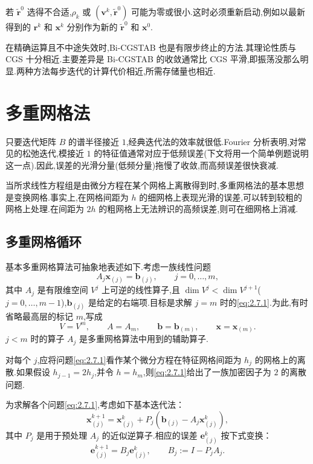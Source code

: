 若 \(\widetilde{\boldsymbol{r}}^0\) 选得不合适,\(\rho_k\) 或 \((\boldsymbol{v}^k,\widetilde{\boldsymbol{r}}^0)\) 可能为零或很小.这时必须重新启动,例如以最新得到的 \(\boldsymbol{r}^k\) 和 \(\boldsymbol{x}^k\) 分别作为新的 \(\widetilde{\boldsymbol{r}}^0\) 和 \(\boldsymbol{x}^0\).

在精确运算且不中途失效时,Bi-CGSTAB 也是有限步终止的方法.其理论性质与 CGS 十分相近.主要差异是 Bi-CGSTAB 的收敛通常比 CGS 平滑,即振荡没那么明显.两种方法每步迭代的计算代价相近,所需存储量也相近.

\section{多重网格法}\label{sec:2.7}

只要迭代矩阵 \(B\) 的谱半径接近 \(1\),经典迭代法的效率就很低.Fourier 分析表明,对常见的松弛迭代,模接近 \(1\) 的特征值通常对应于低频误差(下文将用一个简单例题说明这一点).因此,误差的光滑分量(低频分量)拖慢了收敛,而高频误差很快衰减.

当所求线性方程组是由微分方程在某个网格上离散得到时,多重网格法的基本思想是变换网格.事实上,在网格间距为 \(h\) 的细网格上表现光滑的误差,可以转到较粗的网格上处理.在间距为 \(2h\) 的粗网格上无法辨识的高频误差,则可在细网格上消减.

\subsection{多重网格循环}\label{sec:2.7.1}

基本多重网格算法可抽象地表述如下.考虑一族线性问题
\begin{equation}\label{eq:2.7.1}
  A_j\boldsymbol{x}_{(j)}=\boldsymbol{b}_{(j)},\qquad j=0,\ldots,m,
\end{equation}
其中 \(A_j\) 是有限维空间 \(V^j\) 上可逆的线性算子,且 \(\dim V^j<\dim V^{j+1}\)(\(j=0,\ldots,m-1\)),\(\boldsymbol{b}_{(j)}\) 是给定的右端项.目标是求解 \(j=m\) 时的\eqref{eq:2.7.1}.为此,有时省略最高层的标记 \(m\),写成
\[
  V=V^m,\qquad A=A_m,\qquad
  \boldsymbol{b}=\boldsymbol{b}_{(m)},\qquad \boldsymbol{x}=\boldsymbol{x}_{(m)}.
\]
\(j<m\) 时的算子 \(A_j\) 是多重网格算法中用到的辅助算子.

对每个 \(j\),应将问题\eqref{eq:2.7.1}看作某个微分方程在特征网格间距为 \(h_j\) 的网格上的离散.如果假设 \(h_{j-1}=2h_j\),并令 \(h=h_m\),则\eqref{eq:2.7.1}给出了一族加密因子为 \(2\) 的离散问题.

为求解各个问题\eqref{eq:2.7.1},考虑如下基本迭代法：
\begin{equation}\label{eq:2.7.2}
  \boldsymbol{x}_{(j)}^{k+1}=\boldsymbol{x}_{(j)}^k+
  P_j(\boldsymbol{b}_{(j)}-A_j\boldsymbol{x}_{(j)}^k),
\end{equation}
其中 \(P_j\) 是用于预处理 \(A_j\) 的近似逆算子.相应的误差 \(\boldsymbol{e}_{(j)}^k\) 按下式变换：
\begin{equation}\label{eq:2.7.3}
  \boldsymbol{e}_{(j)}^{k+1}=B_j\boldsymbol{e}_{(j)}^k,\qquad B_j:=I-P_jA_j.
\end{equation}

